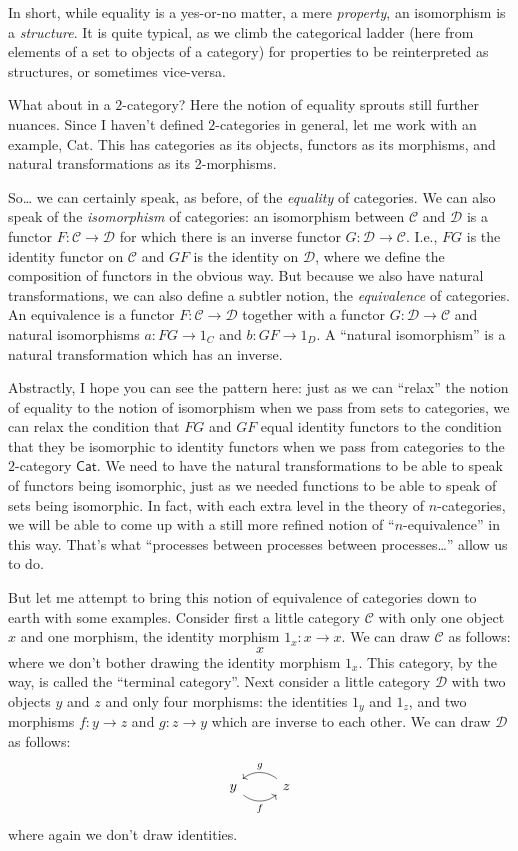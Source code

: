 \documentclass{article}
\begin{document}
In short, while equality is a yes-or-no matter, a mere \emph{property},
an isomorphism is a \emph{structure}. It is quite typical, as we climb
the categorical ladder (here from elements of a set to objects of a
category) for properties to be reinterpreted as structures, or sometimes
vice-versa.

What about in a \(2\)-category? Here the notion of equality sprouts
still further nuances. Since I haven't defined \(2\)-categories in
general, let me work with an example, Cat. This has categories as its
objects, functors as its morphisms, and natural transformations as its
2-morphisms.

So\ldots{} we can certainly speak, as before, of the \emph{equality} of
categories. We can also speak of the \emph{isomorphism} of categories:
an isomorphism between \(\mathcal{C}\) and \(\mathcal{D}\) is a functor
\(F\colon\mathcal{C}\to\mathcal{D}\) for which there is an inverse
functor \(G\colon\mathcal{D}\to\mathcal{C}\). I.e., \(FG\) is the
identity functor on \(\mathcal{C}\) and \(GF\) is the identity on
\(\mathcal{D}\), where we define the composition of functors in the
obvious way. But because we also have natural transformations, we can
also define a subtler notion, the \emph{equivalence} of categories. An
equivalence is a functor \(F\colon\mathcal{C}\to\mathcal{D}\) together
with a functor \(G\colon\mathcal{D}\to\mathcal{C}\) and natural
isomorphisms \(a\colon FG\to 1_C\) and \(b\colon GF \to 1_D\). A
``natural isomorphism'' is a natural transformation which has an
inverse.

Abstractly, I hope you can see the pattern here: just as we can
``relax'' the notion of equality to the notion of isomorphism when we
pass from sets to categories, we can relax the condition that \(FG\) and
\(GF\) equal identity functors to the condition that they be isomorphic
to identity functors when we pass from categories to the \(2\)-category
\(\mathsf{Cat}\). We need to have the natural transformations to be able
to speak of functors being isomorphic, just as we needed functions to be
able to speak of sets being isomorphic. In fact, with each extra level
in the theory of \(n\)-categories, we will be able to come up with a
still more refined notion of ``\(n\)-equivalence'' in this way. That's
what ``processes between processes between processes\ldots{}'' allow us
to do.

But let me attempt to bring this notion of equivalence of categories
down to earth with some examples. Consider first a little category
\(\mathcal{C}\) with only one object \(x\) and one morphism, the
identity morphism \(1_x\colon x\to x\). We can draw \(\mathcal{C}\) as
follows: \[x\] where we don't bother drawing the identity morphism
\(1_x\). This category, by the way, is called the ``terminal category''.
Next consider a little category \(\mathcal{D}\) with two objects \(y\)
and \(z\) and only four morphisms: the identities \(1_y\) and \(1_z\),
and two morphisms \(f\colon y\to z\) and \(g\colon z\to y\) which are
inverse to each other. We can draw \(\mathcal{D}\) as follows: \[
  \begin{tikzcd}
    y \rar[bend right=40,swap,"f"] & z \lar[bend right=40,swap,"g"]
  \end{tikzcd}
\] where again we don't draw identities.
\end{document}
